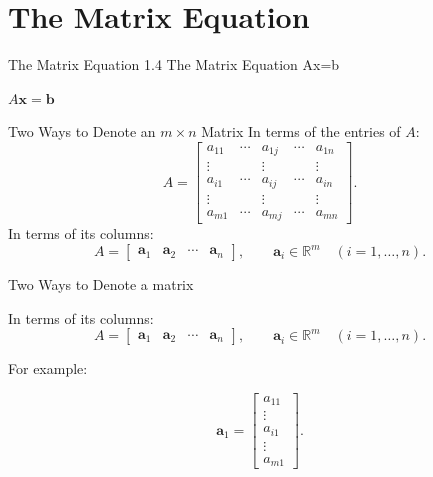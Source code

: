
\section{The Matrix Equation}
\begin{frame}{The Matrix Equation}
  \centering
  \Large 1.4 The Matrix Equation Ax=b

  \bigskip
  \Huge $A\mathbf{x}=\mathbf{b}$
\end{frame}

\begin{frame}{Two Ways to Denote an $m\times n$ Matrix}
  In terms of the entries of $A$:
  \[
    A=\begin{bmatrix}
      a_{11}&\cdots&a_{1j}&\cdots&a_{1n}\\
      \vdots&&\vdots&&\vdots\\
      a_{i1}&\cdots&a_{ij}&\cdots&a_{in}\\
      \vdots&&\vdots&&\vdots\\
      a_{m1}&\cdots&a_{mj}&\cdots&a_{mn}
    \end{bmatrix}.
  \]
  In terms of its columns:
  \[
    A=\begin{bmatrix}\mathbf{a}_1&\mathbf{a}_2&\cdots&\mathbf{a}_n\end{bmatrix},
    \qquad \mathbf{a}_i\in\mathbb{R}^m\quad(i=1,\ldots,n).
  \]

  
\end{frame}

\begin{frame}{Two Ways to Denote a matrix}
   
 In terms of its columns:
  \[
    A=\begin{bmatrix}\mathbf{a}_1&\mathbf{a}_2&\cdots&\mathbf{a}_n\end{bmatrix},
    \qquad \mathbf{a}_i\in\mathbb{R}^m\quad(i=1,\ldots,n).
  \]

   For example:

   \[
     \mathbf{a}_1 = \begin{bmatrix}
       a_{11}\\\vdots\\a_{i1}\\\vdots\\a_{m1} 
     \end{bmatrix}.
  \]

\end{frame}

